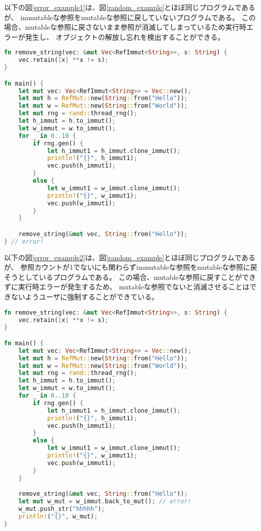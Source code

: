\documentclass{sumiilab-paper}
\theoremstyle{mystyle}
\numberwithin{definition}{chapter} %
\begin{document}
以下の図\ref{error_example1}は、図\ref{random_example}とほぼ同じプログラムであるが、
immutableな参照をmutableな参照に戻していないプログラムである。
この場合、mutableな参照に戻さないまま参照が消滅してしまっているため実行時エラーが発生し、
オブジェクトの解放し忘れを検出することができる。
\begin{lstlisting}[language=Rust, caption=オブジェクトの解放し忘れを検出する例, 
  label=error_example1, captionpos=b]
fn remove_string(vec: &mut Vec<RefImmut<String>>, s: String) {
    vec.retain(|x| **x != s);
}

fn main() {
    let mut vec: Vec<RefImmut<String>> = Vec::new();
    let mut h = RefMut::new(String::from("Hello"));
    let mut w = RefMut::new(String::from("World"));
    let mut rng = rand::thread_rng();
    let h_immut = h.to_immut();
    let w_immut = w.to_immut();
    for _ in 0..10 {
        if rng.gen() {
            let h_immut1 = h_immut.clone_immut();
            println!("{}", h_immut1);
            vec.push(h_immut1);
        }
        else {
            let w_immut1 = w_immut.clone_immut();
            println!("{}", w_immut1);
            vec.push(w_immut1);
        }
    }

    remove_string(&mut vec, String::from("Hello"));
} // error!
\end{lstlisting}

以下の図\ref{error_example2}は、図\ref{random_example}とほぼ同じプログラムであるが、
参照カウントが1でないにも関わらずimmutableな参照をmutableな参照に戻そうとしているプログラムである。
この場合、mutableな参照に戻すことができずに実行時エラーが発生するため、
mutableな参照でないと消滅させることはできないようユーザに強制することができている。
\begin{lstlisting}[language=Rust, caption=mutableな参照へ戻せないことを検出する例, 
  label=error_example2, captionpos=b]
fn remove_string(vec: &mut Vec<RefImmut<String>>, s: String) {
    vec.retain(|x| **x != s);
}

fn main() {
    let mut vec: Vec<RefImmut<String>> = Vec::new();
    let mut h = RefMut::new(String::from("Hello"));
    let mut w = RefMut::new(String::from("World"));
    let mut rng = rand::thread_rng();
    let h_immut = h.to_immut();
    let w_immut = w.to_immut();
    for _ in 0..10 {
        if rng.gen() {
            let h_immut1 = h_immut.clone_immut();
            println!("{}", h_immut1);
            vec.push(h_immut1);
        }
        else {
            let w_immut1 = w_immut.clone_immut();
            println!("{}", w_immut1);
            vec.push(w_immut1);
        }
    }

    remove_string(&mut vec, String::from("Hello"));
    let mut w_mut = w_immut.back_to_mut(); // error!
    w_mut.push_str("hhhhh");
    println!("{}", w_mut);
}
\end{lstlisting}
\end{document}
